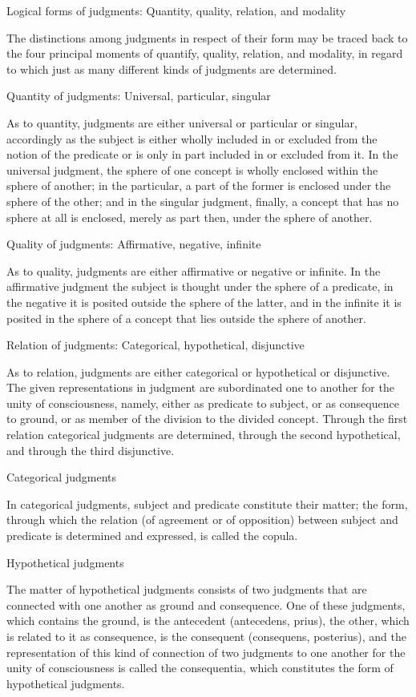 Logical forms of judgments: Quantity, quality, relation, and modality

The distinctions among judgments in respect of their form
may be traced back to the four principal moments of
quantify, quality, relation, and modality,
in regard to which just as many different kinds of judgments are determined.

Quantity of judgments: Universal, particular, singular

As to quantity, judgments are either
universal or particular or singular,
accordingly as the subject is either
wholly included in or excluded from
the notion of the predicate
or is only in part included in or excluded from it.
In the universal judgment, the sphere of one concept is
wholly enclosed within the sphere of another;
in the particular, a part of the former is
enclosed under the sphere of the other;
and in the singular judgment, finally,
a concept that has no sphere at all is enclosed,
merely as part then, under the sphere of another.

Quality of judgments: Affirmative, negative, infinite

As to quality, judgments are either
affirmative or negative or infinite.
In the affirmative judgment the subject
is thought under the sphere of a predicate,
in the negative it is posited outside the sphere of the latter,
and in the infinite it is posited in the sphere of a concept
that lies outside the sphere of another.

Relation of judgments: Categorical, hypothetical, disjunctive

As to relation, judgments are either
categorical or hypothetical or disjunctive.
The given representations in judgment are
subordinated one to another
for the unity of consciousness, namely, either
as predicate to subject, or
as consequence to ground, or
as member of the division to the divided concept.
Through the first relation categorical judgments are determined,
through the second hypothetical,
and through the third disjunctive.

Categorical judgments

In categorical judgments, subject and predicate constitute their matter;
the form, through which the relation (of agreement or of opposition)
between subject and predicate is determined and expressed,
is called the copula.

Hypothetical judgments

The matter of hypothetical judgments consists of
two judgments that are connected with one another
as ground and consequence.
One of these judgments, which contains the ground,
is the antecedent (antecedens, prius),
the other, which is related to it as consequence,
is the consequent (consequens, posterius),
and the representation of this kind of connection of
two judgments to one another for the unity of consciousness
is called the consequentia,
which constitutes the form of hypothetical judgments.

